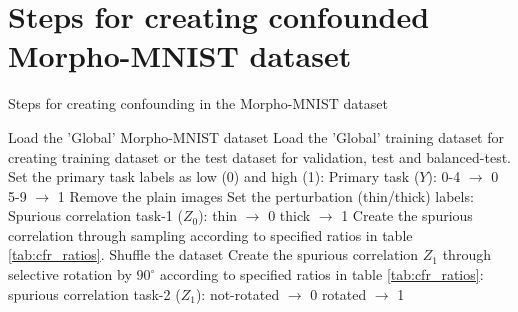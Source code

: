 \documentclass[12pt,DIV14,BCOR12mm,a4paper,footinclude=false,headinclude,parskip=half-,twoside,openright,cleardoublepage=empty,toc=index,bibliography=totoc,listof=totoc]{scrreprt}
\numberwithin{equation}{chapter}
\begin{document}
\section{Steps for creating confounded Morpho-MNIST dataset}
\begin{algorithm}[H] 
\caption{Steps for creating confounding in the Morpho-MNIST dataset}
\label{alg:create_morpho}
\begin{algorithmic}[1]
\State Load the 'Global' Morpho-MNIST dataset
\State Load the 'Global' training dataset for creating training dataset or the test dataset for validation, test and balanced-test.
\State Set the primary task labels as low (0) and high (1):
\Statex \hspace{\algorithmicindent} Primary task ($Y$): \hspace{0.5cm} 0-4 $\rightarrow$ 0 \hspace{0.5cm} 5-9 $\rightarrow$ 1
\State Remove the plain images
\State Set the perturbation (thin/thick) labels:
\Statex \hspace{\algorithmicindent} Spurious correlation task-1 ($Z_0$): \hspace{0.5cm} thin $\rightarrow$ 0 \hspace{0.5cm} thick $\rightarrow$ 1
\State Create the spurious correlation through sampling according to specified ratios in table \ref{tab:cfr_ratios}.
\State Shuffle the dataset 
\State Create the spurious correlation $Z_1$ through selective rotation by $90^\circ$ according to specified ratios in table \ref{tab:cfr_ratios}:
\Statex \hspace{\algorithmicindent} spurious correlation task-2 ($Z_1$): \hspace{0.5cm} not-rotated $\rightarrow$ 0 \hspace{0.5cm} rotated $\rightarrow$ 1
\end{algorithmic}
\end{algorithm}
\end{document}
